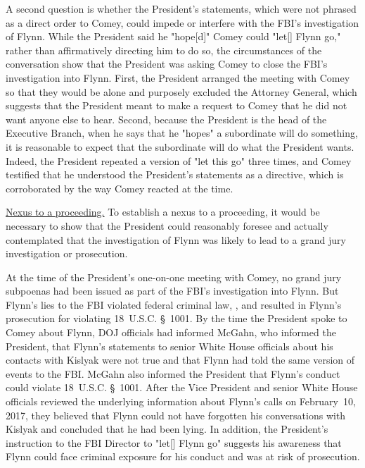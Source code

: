 A second question is whether the President's statements, which were not phrased as a direct order to Comey, could impede or interfere with the FBI's investigation of Flynn.
While the President said he "hope[d]" Comey could "let[] Flynn go," rather than affirmatively directing him to do so, the circumstances of the conversation show that the President was asking Comey to close the FBI's investigation into Flynn.
First, the President arranged the meeting with Comey so that they would be alone and purposely excluded the Attorney General, which suggests that the President meant to make a request to Comey that he did not want anyone else to hear.
Second, because the President is the head of the Executive Branch, when he says that he "hopes" a subordinate will do something, it is reasonable to expect that the subordinate will do what the President wants.
Indeed, the President repeated a version of "let this go" three times, and Comey testified that he understood the President's statements as a directive, which is corroborated by the way Comey reacted at the time.

\underline{Nexus to a proceeding.}
To establish a nexus to a proceeding, it would be necessary to show that the President could reasonably foresee and actually contemplated that the investigation of Flynn was likely to lead to a grand jury investigation or prosecution.

At the time of the President's one-on-one meeting with Comey, no grand jury subpoenas had been issued as part of the FBI's investigation into Flynn.
But Flynn's lies to the FBI violated federal criminal law, , and resulted in Flynn's prosecution for violating 18~U.S.C. \S~1001.
By the time the President spoke to Comey about Flynn, DOJ officials had informed McGahn, who informed the President, that Flynn's statements to senior White House officials about his contacts with Kislyak were not true and that Flynn had told the same version of events to the FBI\null.
McGahn also informed the President that Flynn's conduct could violate 18~U.S.C. \S~1001.
After the Vice President and senior White House officials reviewed the underlying information about Flynn's calls on February~10, 2017, they believed that Flynn could not have forgotten his conversations with Kislyak and concluded that he had been lying.
In addition, the President's instruction to the FBI Director to "let[] Flynn go" suggests his awareness that Flynn could face criminal exposure for his conduct and was at risk of prosecution.

